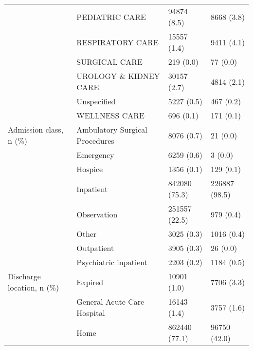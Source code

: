 \begin{tabular}{llll}
                                       & PEDIATRIC CARE &                           94874 (8.5) &        8668 (3.8) \\
                                       & RESPIRATORY CARE &                           15557 (1.4) &        9411 (4.1) \\
                                       & SURGICAL CARE &                             219 (0.0) &          77 (0.0) \\
                                       & UROLOGY \& KIDNEY CARE &                           30157 (2.7) &        4814 (2.1) \\
                                       & Unspecified &                            5227 (0.5) &         467 (0.2) \\
                                       & WELLNESS CARE &                             696 (0.1) &         171 (0.1) \\
Admission class, n (\%) & Ambulatory Surgical Procedures &                            8076 (0.7) &          21 (0.0) \\
                                       & Emergency &                            6259 (0.6) &           3 (0.0) \\
                                       & Hospice &                            1356 (0.1) &         129 (0.1) \\
                                       & Inpatient &                         842080 (75.3) &     226887 (98.5) \\
                                       & Observation &                         251557 (22.5) &         979 (0.4) \\
                                       & Other &                            3025 (0.3) &        1016 (0.4) \\
                                       & Outpatient &                            3905 (0.3) &          26 (0.0) \\
                                       & Psychiatric inpatient &                            2203 (0.2) &        1184 (0.5) \\
Discharge location, n (\%) & Expired &                           10901 (1.0) &        7706 (3.3) \\
                                       & General Acute Care Hospital &                           16143 (1.4) &        3757 (1.6) \\
                                       & Home &                         862440 (77.1) &      96750 (42.0) \\

\end{tabular}
